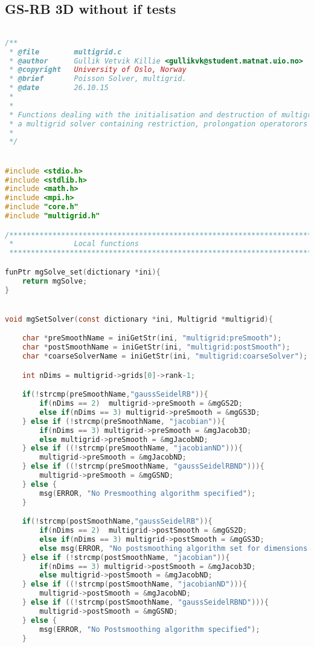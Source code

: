 \subsection{GS-RB 3D without if tests}
\begin{lstlisting}[language=c, caption = main routine]

/**
 * @file		multigrid.c
 * @author		Gullik Vetvik Killie <gullikvk@student.matnat.uio.no>
 * @copyright	University of Oslo, Norway
 * @brief		Poisson Solver, multigrid.
 * @date		26.10.15
 *
 *
 * Functions dealing with the initialisation and destruction of multigrid structures and
 * a multigrid solver containing restriction, prolongation operatorors and smoothers
 *
 */


#include <stdio.h>
#include <stdlib.h>
#include <math.h>
#include <mpi.h>
#include "core.h"
#include "multigrid.h"

/******************************************************************************
 * 				Local functions
 *****************************************************************************/

funPtr mgSolve_set(dictionary *ini){
	return mgSolve;
}


void mgSetSolver(const dictionary *ini, Multigrid *multigrid){

	char *preSmoothName = iniGetStr(ini, "multigrid:preSmooth");
    char *postSmoothName = iniGetStr(ini, "multigrid:postSmooth");
    char *coarseSolverName = iniGetStr(ini, "multigrid:coarseSolver");

	int nDims = multigrid->grids[0]->rank-1;

	if(!strcmp(preSmoothName,"gaussSeidelRB")){
		if(nDims == 2)	multigrid->preSmooth = &mgGS2D;
		else if(nDims == 3) multigrid->preSmooth = &mgGS3D;
    } else if (!strcmp(preSmoothName, "jacobian")){
		if(nDims == 3) multigrid->preSmooth = &mgJacob3D;
		else multigrid->preSmooth = &mgJacobND;
 	} else if ((!strcmp(preSmoothName, "jacobianND"))){
		multigrid->preSmooth = &mgJacobND;
	} else if ((!strcmp(preSmoothName, "gaussSeidelRBND"))){
		multigrid->preSmooth = &mgGSND;
	} else {
    	msg(ERROR, "No Presmoothing algorithm specified");
    }

    if(!strcmp(postSmoothName,"gaussSeidelRB")){
		if(nDims == 2)	multigrid->postSmooth = &mgGS2D;
		else if(nDims == 3) multigrid->postSmooth = &mgGS3D;
		else msg(ERROR, "No postsmoothing algorithm set for dimensions %d", nDims);
	} else if (!strcmp(postSmoothName, "jacobian")){
		if(nDims == 3) multigrid->postSmooth = &mgJacob3D;
		else multigrid->postSmooth = &mgJacobND;
	} else if ((!strcmp(postSmoothName, "jacobianND"))){
		multigrid->postSmooth = &mgJacobND;
	} else if ((!strcmp(postSmoothName, "gaussSeidelRBND"))){
		multigrid->postSmooth = &mgGSND;
 	} else {
    	msg(ERROR, "No Postsmoothing algorithm specified");
    }


\end{lstlisting}
